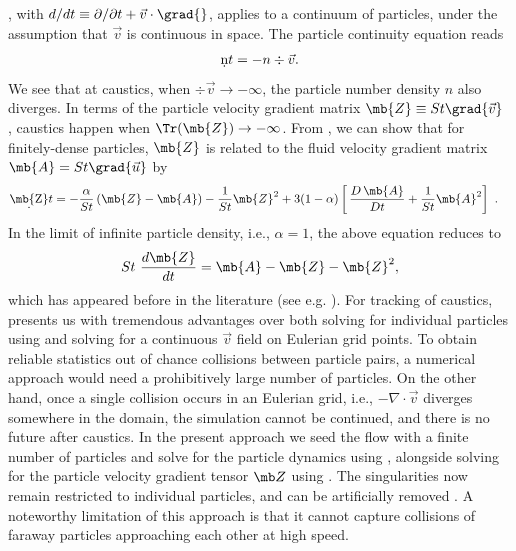 , with $d/dt \equiv \partial/\partial t + \vec{v}\cdot \grad{}$, applies to a continuum of particles, under the assumption that $\vec{v}$ is continuous in space. 
The particle continuity equation reads
    \begin{align}
    \begin{split}
        \d{n}{t}{} = - n \div{\vec{v}}.
    \end{split}    
    \end{align}
   We see that at caustics, when $\div{\vec{v}} \to -\infty$, the particle number density $n$ also diverges. In terms of the particle velocity gradient matrix $\mb{Z}  \equiv St\grad{\vec{v}}$ \cite{falkovich2002,meibohm2021}, caustics happen when $\Tr(\mb{Z}) \to -\infty$. From , we can show that for finitely-dense particles, $\mb{Z}$ is related to the fluid velocity gradient matrix $\mb{A} = St\grad{\vec{u}}$ by
    \begin{align}
    \label{Zeom}
    \begin{split}
      \d{\mb{Z}}{t}{}    &= - \frac{\alpha}{St}\left( \mb{Z} -   \mb{A} \right)- \frac{1}{St}\mb{Z}^2+  3(1-\alpha)\left[ \,\frac{ D\, \mb{A}}{Dt}+ \frac{1}{St}\mb{A}^2  \right] \ .
    \end{split}
    \end{align}
   In the limit of infinite particle density, i.e., $\alpha=1$, the above equation reduces to 
   \begin{equation}    
   St~ \frac{d\mb{Z}}{dt} = \mb{A} - \mb{Z} - \mb{Z}^2,
   \label{theirs}
   \end{equation} 
   which has appeared before in the literature (see e.g. \cite{falkovich2002,wilkinson2006,meibohm2023}). For tracking of caustics,  presents us with tremendous advantages over both solving for individual particles using  and solving for a continuous $\vec v$ field on Eulerian grid points. To obtain reliable statistics out of chance collisions between particle pairs, a numerical approach would need a prohibitively large number of particles. On the other hand, once a single collision occurs in an Eulerian grid, i.e.,  $-\nabla \cdot \vec v$ diverges somewhere in the domain, the simulation cannot be continued, and there is no future after caustics. In the present approach we seed the flow with a finite number of particles and solve for the particle dynamics using , alongside solving for the particle velocity gradient tensor $\mb Z$ using . The singularities now remain restricted to individual particles, and can be artificially removed \cite{falkovich2007}. A noteworthy limitation of this approach is that it cannot capture collisions of faraway particles approaching each other at high speed. 
   
